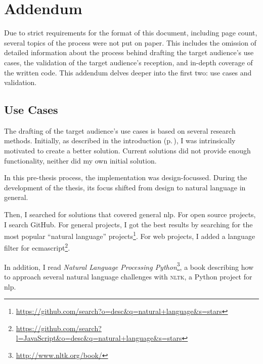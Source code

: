 
\begingroup
\let\clearpage\relax
\let\cleardoublepage\relax
\let\cleardoublepage\relax

\manualmark
{}

\chapter*{Addendum}\label{addendum}

Due to strict requirements for the format of this document, including page
  count, several topics of the process were not put on paper.
This includes the omission of detailed information about the process behind
  drafting the target audience's use cases, the validation of the
  target audience's reception, and in-depth coverage of the written code.
This addendum delves deeper into the first two: use cases and validation.

\section*{Use Cases}\label{addendum-use-cases}

The drafting of the target audience's use cases is based on several research
  methods.
Initially, as described in the introduction (p.\,\pageref{introduction}), I
  was intrinsically motivated to create a better solution.
Current solutions did not provide enough functionality,
  neither did my own initial solution.

In this pre-thesis process, the implementation was design-focussed.
During the development of the thesis, its focus shifted from design to
  natural language in general.

Then, I searched for solutions that covered general \gls{nlp}.
For open source projects, I search GitHub.
For general projects, I got the best results by searching for the most
  popular ``natural language'' projects\footnote{
    \url{https://github.com/search?o=desc&q=natural+language&s=stars}
  }.
For web projects, I added a language filter for \gls{ecmascript}\footnote{
    \url{https://github.com/search?l=JavaScript&o=desc&q=natural+language&s=stars}
  }.

In addition, I read \emph{Natural Language Processing Python}\footnote{
    \url{http://www.nltk.org/book/}
  }, a book describing how to approach several natural language challenges
  with \textsc{nltk}, a Python project for \gls{nlp}.

